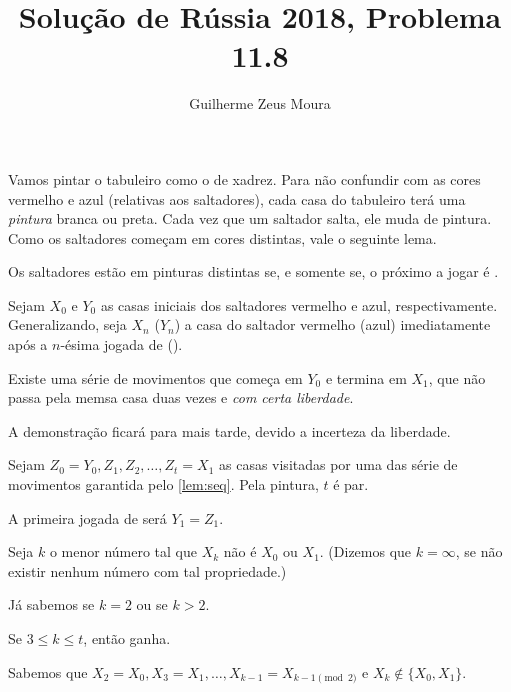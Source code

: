 \documentclass[10pt, a4paper]{article}
\title{Solução de Rússia 2018, Problema 11.8}
\author{Guilherme Zeus Moura}
\newcommand{\X}[1]{X_{#1}}
\newcommand{\Y}[1]{Y_{#1}}
\newcommand{\Z}[1]{Z_{#1}}
\begin{document}
	
	\zeustitle


	\begin{sol}
		Vamos pintar o tabuleiro como o de xadrez.
		Para não confundir com as cores vermelho e azul (relativas aos saltadores), cada casa do tabuleiro terá uma \emph{pintura} branca ou preta. Cada vez que um saltador salta, ele muda de pintura. Como os saltadores começam em cores distintas, vale o seguinte lema.

		\begin{lem}
			Os saltadores estão em pinturas distintas se, e somente se, o próximo a jogar é .
		\end{lem}

		Sejam $\X{0}$ e $\Y{0}$ as casas iniciais dos saltadores vermelho e azul, respectivamente. Generalizando, seja $\X{n}$ ($\Y{n}$) a casa do saltador vermelho (azul) imediatamente após a $n$-ésima jogada de  (\playerB{Bazil}).

		\begin{lem} \label{lem:seq}
			Existe uma série de movimentos que começa em $\Y{0}$ e termina em $\X{1}$, que não passa pela memsa casa duas vezes e \emph{com certa liberdade}.
		\end{lem}
		\begin{dem}
			A demonstração ficará para mais tarde, devido a incerteza da liberdade.
		\end{dem}

		Sejam $\Z{0} = \Y{0}, \Z{1}, \Z{2}, \dots, \Z{t} = \X{1}$ as casas visitadas por uma das série de movimentos garantida pelo \cref{lem:seq}. Pela pintura, $t$ é par. 

		A primeira jogada de  será $\Y{1} = \Z{1}$.

		Seja $k$ o menor número tal que $\X{k}$ não é $\X{0}$ ou $\X{1}$. (Dizemos que $k = \infty$, se não existir nenhum número com tal propriedade.)

		Já sabemos se $k = 2$ ou se $k > 2$.

		\begin{lem}
			Se $3 \le k \le t$, então \playerB{Bazil} ganha.
		\end{lem}

		\begin{dem}
			Sabemos que $\X{2} = \X{0}, \X{3} = \X{1}, \dots, \X{k-1} = \X{k-1 \pmod{2}}$ e $X_k \not\in \{X_0, X_1\}$.
		\end{dem}
	\end{sol}
\end{document}
